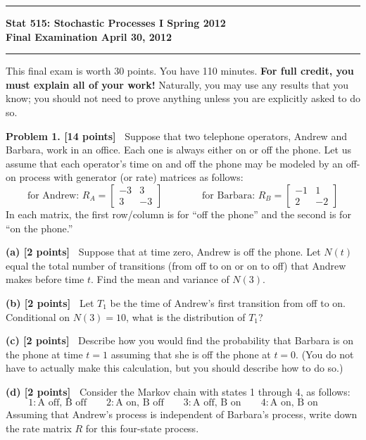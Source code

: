 \documentclass{article}
\newcommand{\svskip}{\vspace{.2in}}
\newcommand{\mvskip}{\vspace{.25in}}
\newcommand{\lvskip}{\vspace{.5in}}
\begin{document}
        \hrule
        \begin{center}
        \Large\bf Stat 515: Stochastic Processes I \hfill Spring 2012\\
        Final Examination  \hfill April 30, 2012
        \end{center}
        \hrule


\mvskip 
This final exam is worth 30 points.  You have 110 minutes.  
{\bf For full credit, you must explain all of your work!}
Naturally, you may use any results that you know; you should not need to prove anything
unless you are explicitly asked to do so.



\lvskip 
{\bf Problem 1. [14 points]\ } 
Suppose that two telephone operators, Andrew and Barbara, work in an office.
Each one is always either on or off the phone.  Let us assume that each operator's 
time on and off the phone may be modeled by an off-on process with generator (or rate)
matrices as follows:
\[
\mbox{for Andrew:\ }
R_A = \begin{bmatrix} -3 & 3 \\ 3 & -3\end{bmatrix}
\qquad\qquad
\mbox{for Barbara:\ }
R_B = \begin{bmatrix} -1 & 1 \\ 2 & -2\end{bmatrix}
\]
In each matrix, the first row/column is for ``off the phone'' and the second is for ``on the phone.''

\svskip
{\bf(a) [2 points]\ }
Suppose that at time zero, Andrew is off the phone.   
Let $N(t)$ equal the total number of transitions (from off to on or on to off) that Andrew makes
before time $t$.  Find the mean and variance of $N(3)$.

\svskip
{\bf(b) [2 points]\ }
Let $T_1$ be the time of Andrew's first transition from off to on.  
Conditional on $N(3)=10$, what is the distribution of $T_1$?

\svskip
{\bf(c) [2 points]\ }
Describe how you would find the probability that Barbara is on the phone at time $t=1$ assuming that she is off the phone at $t=0$.
(You do not have to actually make this calculation, but you should describe how to do so.)

\svskip
{\bf(d) [2 points]\ }
Consider the Markov chain with states 1 through 4, as follows:
\[
1: \mbox{A off, B off} \qquad
2: \mbox{A on, B off} \qquad
3: \mbox{A off, B on} \qquad
4: \mbox{A on, B on} \qquad
\]
Assuming that Andrew's process is independent of Barbara's process,
write down the rate matrix $R$ for this four-state process.
\end{document}
